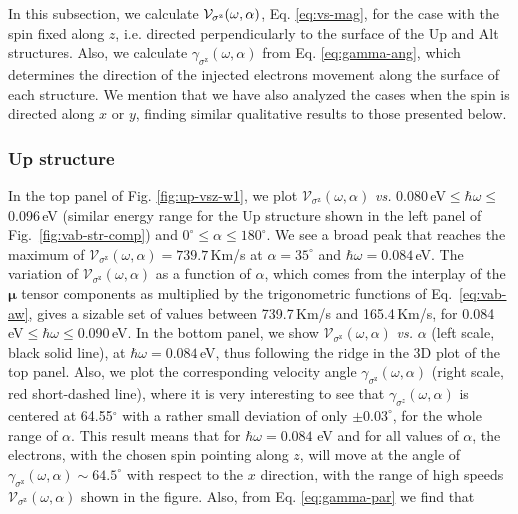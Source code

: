 \documentclass[floatfix,prb,aps,superscriptaddress,showpacs,11pt,preprint,letterpaper]{revtex4}
\begin{document}
In this subsection, we calculate ${\cal V}_{\sigma^\mathrm{z}}(\omega,\alpha)$,
Eq. \eqref{eq:vs-mag}, for the case with the spin fixed along $z$, i.e.
directed perpendicularly to the surface of the Up and Alt structures. Also, we
calculate $\gamma_{\sigma^\mathrm{z}}(\omega,\alpha)$ from Eq. 
\eqref{eq:gamma-ang}, which determines the direction  of the injected 
electrons movement along the surface of  each structure. We mention that we
have also  analyzed the cases when the spin  is directed along $x$ or
$y$, finding similar qualitative results to those presented below.

\subsubsection{Up structure}\label{up:fs}

In the top panel of Fig. \ref{fig:up-vsz-w1}, we plot
$\mathcal{V}_{\sigma^{\mathrm{z}}} (\omega,\alpha)$ {\it vs.}
0.080\,eV$\leq\hbar\omega\leq$0.096\,eV (similar energy range for the Up
structure shown in the left panel of Fig.~\ref{fig:vab-str-comp}) and
$0^\circ\leq\alpha\leq 180^\circ$. We see a broad peak that reaches the maximum
of $\mathcal{V}_{\sigma^{\mathrm{z}}}(\omega,\alpha) = 739.7$\,Km/s at
$\alpha=35^{\circ}$ and $\hbar\omega= 0.084$\,eV.  The variation of
$\mathcal{V}_{\sigma^{\mathrm{z}}} (\omega,\alpha)$ as a function of $\alpha$,
which comes from the interplay of the $\boldsymbol{\mu}$ tensor components as
multiplied by the  trigonometric functions of Eq.~\eqref{eq:vab-aw}, gives a
sizable set of values between 739.7\,Km/s and 165.4\,Km/s, for
0.084\,eV$\leq\hbar\omega\leq$0.090\,eV. In the bottom panel, we show
$\mathcal{V}_{\sigma^{\mathrm{z}}} (\omega,\alpha)$ {\it vs.} $\alpha$ (left scale,
black solid line), at $\hbar\omega= 0.084$\,eV, thus following the ridge in the 3D
plot of the top panel. Also, we plot the corresponding velocity angle
$\gamma_{\sigma^\mathrm{z}}(\omega,\alpha)$ (right scale, red
short-dashed line), where it
is very interesting to see that $\gamma_{\sigma^z}(\omega,\alpha)$ is centered
at 64.55$^\circ$ with a rather small deviation of only $\pm 0.03^\circ$, for
the whole range of $\alpha$. This result means that for $\hbar\omega=0.084$ eV
and for all values of $\alpha$, the electrons, with the chosen spin pointing
along $z$, will move at the angle of $\gamma_{\sigma^\mathrm{z}}(\omega,\alpha)
\sim 64.5^{\circ}$ with respect to the $x$ direction, with the range of  high
speeds $\mathcal{V}_{\sigma^{\mathrm{z}}} (\omega,\alpha)$ shown in the figure.
Also, from Eq. \eqref{eq:gamma-par} we find that
\end{document}
